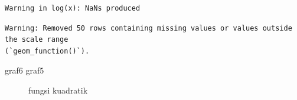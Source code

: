 \documentclass[
  letterpaper,
  DIV=11,
  numbers=noendperiod]{scrartcl}
\newenvironment{Shaded}{\begin{snugshade}}{\end{snugshade}}
\newcommand{\NormalTok}[1]{\textcolor[rgb]{0.00,0.23,0.31}{#1}}
\begin{document}
\begin{verbatim}
Warning in log(x): NaNs produced
\end{verbatim}

\begin{verbatim}
Warning: Removed 50 rows containing missing values or values outside the scale range
(`geom_function()`).
\end{verbatim}

\begin{Shaded}
\begin{Highlighting}[]
\NormalTok{graf6}
\NormalTok{graf5}
\end{Highlighting}
\end{Shaded}

\begin{figure}

\begin{minipage}[t]{0.33\linewidth}

{\centering 


\caption{fungsi kuadratik}

}

\end{minipage}%
%
\begin{minipage}[t]{0.33\linewidth}

{\centering 

}
\end{minipage}
\end{figure}
\end{document}
